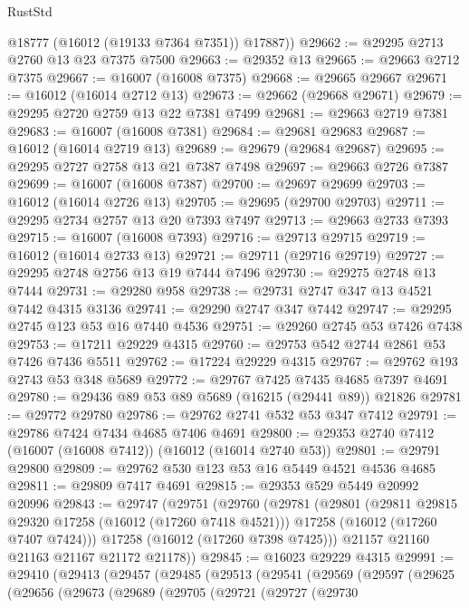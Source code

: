 \begin{lexlean}{RustStd}
\begin{coremodule}
        @18777
        (@16012 (@19133 @7364 @7351))
        @17887))
@29662 := @29295 @2713 @2760 @13 @23 @7375 @7500
@29663 := @29352 @13
@29665 := @29663 @2712 @7375
@29667 := @16007 (@16008 @7375)
@29668 := @29665 @29667
@29671 := @16012 (@16014 @2712 @13)
@29673 := @29662 (@29668 @29671)
@29679 := @29295 @2720 @2759 @13 @22 @7381 @7499
@29681 := @29663 @2719 @7381
@29683 := @16007 (@16008 @7381)
@29684 := @29681 @29683
@29687 := @16012 (@16014 @2719 @13)
@29689 := @29679 (@29684 @29687)
@29695 := @29295 @2727 @2758 @13 @21 @7387 @7498
@29697 := @29663 @2726 @7387
@29699 := @16007 (@16008 @7387)
@29700 := @29697 @29699
@29703 := @16012 (@16014 @2726 @13)
@29705 := @29695 (@29700 @29703)
@29711 := @29295 @2734 @2757 @13 @20 @7393 @7497
@29713 := @29663 @2733 @7393
@29715 := @16007 (@16008 @7393)
@29716 := @29713 @29715
@29719 := @16012 (@16014 @2733 @13)
@29721 := @29711 (@29716 @29719)
@29727 := @29295 @2748 @2756 @13 @19 @7444 @7496
@29730 := @29275 @2748 @13 @7444
@29731 := @29280 @958
@29738 := @29731 @2747 @347 @13 @4521 @7442 @4315 @3136
@29741 := @29290 @2747 @347 @7442
@29747 := @29295 @2745 @123 @53 @16 @7440 @4536
@29751 := @29260 @2745 @53 @7426 @7438
@29753 := @17211 @29229 @4315
@29760 := @29753 @542 @2744 @2861 @53 @7426 @7436 @5511
@29762 := @17224 @29229 @4315
@29767 := @29762 @193 @2743 @53 @348 @5689
@29772 := @29767 @7425 @7435 @4685 @7397 @4691
@29780 := @29436 @89 @53 @89 @5689 (@16215 (@29441 @89)) @21826
@29781 := @29772 @29780
@29786 := @29762 @2741 @532 @53 @347 @7412
@29791 := @29786 @7424 @7434 @4685 @7406 @4691
@29800 := @29353 @2740 @7412 (@16007 (@16008 @7412)) (@16012 (@16014 @2740 @53))
@29801 := @29791 @29800
@29809 := @29762 @530 @123 @53 @16 @5449 @4521 @4536 @4685
@29811 := @29809 @7417 @4691
@29815 := @29353 @529 @5449 @20992 @20996
@29843 := @29747
    (@29751
      (@29760
        (@29781
          (@29801
            (@29811 @29815 @29320 @17258 (@16012 (@17260 @7418 @4521)))
            @17258
            (@16012 (@17260 @7407 @7424)))
          @17258
          (@16012 (@17260 @7398 @7425)))
        @21157
        @21160
        @21163
        @21167
        @21172
        @21178))
@29845 := @16023 @29229 @4315
@29991 := @29410
    (@29413
      (@29457
        (@29485
          (@29513
            (@29541
              (@29569
                (@29597
                  (@29625
                    (@29656
                      (@29673
                        (@29689
                          (@29705
                            (@29721
                              (@29727
                                (@29730

\end{coremodule}
\end{lexlean}
